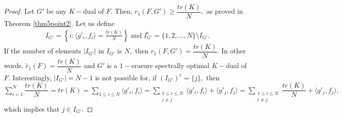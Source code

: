 \documentclass[final,1p,times]{elsarticle}
\begin{document}
	\begin{proof}
		Let $G'$ be any $K-$dual of $F.$ Then, $r_{1}(F,G')\geq \dfrac{tr(K)}{N},$ as proved in Theorem \ref{thm5point2}. Let us define
		\begin{align*}
			I_{G'} = \left\{i:\langle g'_i,f_i\rangle = \frac{tr(K)}{N}\right\}\;\text{and}\;
			I_{G'}^c= \{1,2,\ldots,N\}\setminus I_{G'} .
		\end{align*}
		If the number of elements $|I_{G'}| $ in $I_{G'}$ is $N,$ then $r_{1}(F,G')= \dfrac{tr(K)}{N}.$ In other words, $\tilde{r}_{1}(F)= \dfrac{tr(K)}{N}$ and  $G'$ is a $1-$erasure spectrally optimal $K-$dual of $F.$ Interestingly, $|I_{G'}| = N-1$  is not possible for, if $(I_{G'})^c = \{j\},$ then $\sum\limits_{i=1}^N \dfrac{tr(K)}{N} = tr(K) = \sum\limits_{1 \leq i \leq N}\langle g'_i,f_i\rangle =  \sum\limits_{\substack{1 \leq i \leq N \\ i\neq j}}\langle g'_i,f_i\rangle + \langle g'_j,f_j\rangle = \sum\limits_{\substack{1 \leq i \leq N \\ i\neq j}} \dfrac{tr(K)}{N} + \langle g'_j,f_j\rangle,$ which implies that $j \in I_{G'}.$
		

\end{proof}
\end{document}
